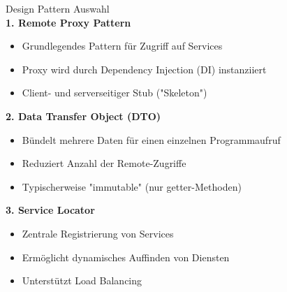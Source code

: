 \begin{KR}{Design Pattern Auswahl}\\
\textbf{1. Remote Proxy Pattern}
\begin{itemize}
    \item Grundlegendes Pattern für Zugriff auf Services
    \item Proxy wird durch Dependency Injection (DI) instanziiert
    \item Client- und serverseitiger Stub ("Skeleton")
\end{itemize}

\textbf{2. Data Transfer Object (DTO)}
\begin{itemize}
    \item Bündelt mehrere Daten für einen einzelnen Programmaufruf
    \item Reduziert Anzahl der Remote-Zugriffe
    \item Typischerweise "immutable" (nur getter-Methoden)
\end{itemize}

\textbf{3. Service Locator}
\begin{itemize}
    \item Zentrale Registrierung von Services
    \item Ermöglicht dynamisches Auffinden von Diensten
    \item Unterstützt Load Balancing
\end{itemize}
\end{KR}

